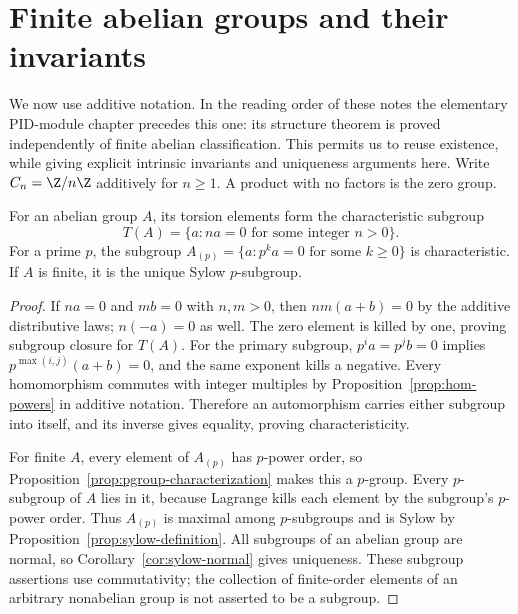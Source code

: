 \chapter{Finite abelian groups and their invariants}\label{chap:M07.07}

We now use additive notation. In the reading order of these notes the elementary PID-module chapter precedes this one: its structure theorem is proved independently of finite abelian classification. This permits us to reuse existence, while giving explicit intrinsic invariants and uniqueness arguments here. Write $C_n=\Z/n\Z$ additively for $n\geq1$. A product with no factors is the zero group.

\begin{proposition}\label{prop:abelian-primary-subgroups}
For an abelian group $A$, its torsion elements form the characteristic subgroup
\[
 T(A)=\{a:na=0\text{ for some integer }n>0\}.
\]
For a prime $p$, the subgroup
$A_{(p)}=\{a:p^ka=0\text{ for some }k\geq0\}$ is characteristic. If $A$ is finite, it is the unique Sylow $p$-subgroup.
\end{proposition}
\begin{proof}
If $na=0$ and $mb=0$ with $n,m>0$, then $nm(a+b)=0$ by the additive distributive laws; $n(-a)=0$ as well. The zero element is killed by one, proving subgroup closure for $T(A)$. For the primary subgroup, $p^ia=p^jb=0$ implies $p^{\max(i,j)}(a+b)=0$, and the same exponent kills a negative. Every homomorphism commutes with integer multiples by Proposition~\ref{prop:hom-powers} in additive notation. Therefore an automorphism carries either subgroup into itself, and its inverse gives equality, proving characteristicity.

For finite $A$, every element of $A_{(p)}$ has $p$-power order, so Proposition~\ref{prop:pgroup-characterization} makes this a $p$-group. Every $p$-subgroup of $A$ lies in it, because Lagrange kills each element by the subgroup's $p$-power order. Thus $A_{(p)}$ is maximal among $p$-subgroups and is Sylow by Proposition~\ref{prop:sylow-definition}. All subgroups of an abelian group are normal, so Corollary~\ref{cor:sylow-normal} gives uniqueness. These subgroup assertions use commutativity; the collection of finite-order elements of an arbitrary nonabelian group is not asserted to be a subgroup.
\end{proof}

